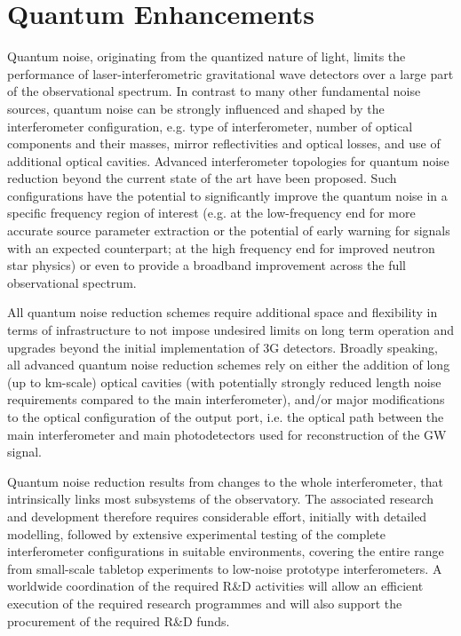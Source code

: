 \chapter{Quantum Enhancements}
\label{sec:Quantum}

Quantum noise, originating from the quantized nature of light, limits the performance of laser-interferometric gravitational wave detectors over a large part of the observational spectrum. In contrast to many other fundamental noise sources, quantum noise can be strongly influenced and shaped by the interferometer configuration, e.g. type of interferometer, number of optical components and their masses, mirror reflectivities and optical losses, and use of additional optical cavities. Advanced interferometer topologies for quantum noise reduction beyond the current state of the art have been proposed. Such configurations have the potential to significantly improve the quantum noise in a specific frequency region of interest (e.g. at the low-frequency end for more accurate source parameter extraction or the potential of early warning for signals with an expected counterpart; at the high frequency end for improved neutron star physics) or even to provide a broadband improvement across the full observational spectrum. 

All quantum noise reduction schemes require additional space and flexibility in terms of infrastructure to not impose undesired limits on long term operation and upgrades beyond the initial implementation of 3G detectors. Broadly speaking, all advanced quantum noise reduction schemes rely on either the addition of long (up to km-scale) optical cavities (with potentially strongly reduced length noise requirements compared to the main interferometer), and/or major modifications to the optical configuration of the output port, i.e. the optical path between the main interferometer and main photodetectors used for reconstruction of the GW signal. 

Quantum noise reduction results from changes to the whole interferometer, that intrinsically links most subsystems of the observatory. The associated research and development therefore requires considerable effort, initially with detailed modelling, followed by extensive experimental testing of the complete interferometer configurations in suitable environments, covering the entire range from small-scale tabletop experiments to low-noise prototype interferometers. A worldwide coordination of the required R\&D activities will allow an efficient execution of the required research programmes and will also support the procurement of the required R\&D funds. 
 
